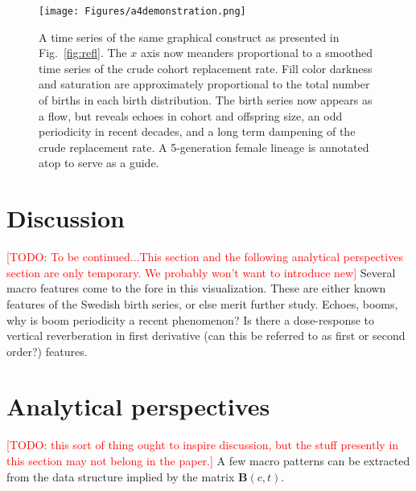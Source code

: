 \documentclass{article}
\renewcommand{\todo}[1]{\textcolor{red}{[TODO: #1]}}
\begin{document}
\begin{figure}
\texttt{[image: Figures/a4demonstration.png]}
%
\caption{A time series of the same graphical construct as presented in Fig.~\ref{fig:refl}. The $x$ axis now meanders proportional to a smoothed time series of the crude cohort replacement rate. Fill color darkness and saturation are approximately proportional to the total number of births in each birth distribution. The birth series now appears as a flow, but reveals echoes in cohort and offspring size, an odd periodicity in recent decades, and a long term dampening of the crude replacement rate. A 5-generation female lineage is annotated atop to serve as a guide.}
\label{fig:foldout}
\end{figure}

\section{Discussion}
\todo{To be continued...This section and the following analytical perspectives section are only temporary. We probably won't want to introduce new}
Several macro features come to the fore in this visualization. These are either known features of the Swedish birth series, or else merit further study. Echoes, booms, why is boom periodicity a recent phenomenon? Is there a dose-response to vertical reverberation in first derivative (can this be referred to as first or second order?) features.


\section{Analytical perspectives}
\todo{this sort of thing ought to inspire discussion, but the stuff presently in this section may not belong in the paper.}
A few macro patterns can be extracted from the data structure implied by the matrix $\mathbf{B}(c,t)$. 
\end{document}
